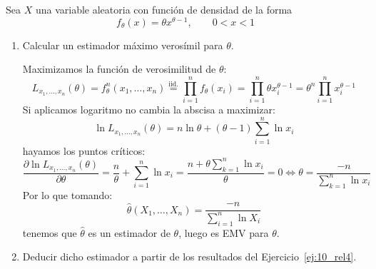\begin{ejercicio}
    Sea $X$ una variable aleatoria con función de densidad de la forma
    \begin{equation*}
        f_\theta(x) = \theta x^{\theta -1}, \qquad 0<x<1
    \end{equation*}
    \begin{enumerate}[label=\alph*)]
        \item Calcular un estimador máximo verosímil para $\theta$.

            Maximizamos la función de verosimilitud de $\theta$:
            \begin{equation*}
                L_{x_1,\ldots,x_n}(\theta) = f^n_\theta(x_1, \ldots, x_n) \stackrel{\text{iid.}}{=}\prod_{i=1}^{n}f_\theta(x_i) = \prod_{i=1}^{n} \theta x_i^{\theta-1} = \theta^n \prod_{i=1}^{n} x_i^{\theta -1}
            \end{equation*}
            Si aplicamos logaritmo no cambia la abscisa a maximizar:
            \begin{equation*}
                \ln L_{x_1,\ldots,x_n}(\theta) = n\ln \theta + (\theta -1)\sum_{i=1}^{n} \ln x_i
            \end{equation*}
            hayamos los puntos críticos:
            \begin{equation*}
                \dfrac{\partial \ln L_{x_1,\ldots,x_n}(\theta)}{\partial  \theta} = \frac{n}{\theta} + \sum_{i=1}^{n}\ln x_i = \frac{n + \theta \sum\limits_{k=1}^{n}\ln x_i}{\theta} = 0 \Longleftrightarrow \theta = \frac{-n}{\sum\limits_{k=1}^{n}\ln x_i}
            \end{equation*}
            Por lo que tomando:
            \begin{equation*}
                \hat{\theta}(X_1, \ldots, X_n) = \frac{-n}{\sum\limits_{i=1}^{n} \ln X_i}
            \end{equation*}
            tenemos que $\hat{\theta}$ es un estimador de $\theta$, luego es EMV para $\theta$.
        \item Deducir dicho estimador a partir de los resultados del Ejercicio~\ref{ej:10_rel4}.


\end{enumerate}
\end{ejercicio}
